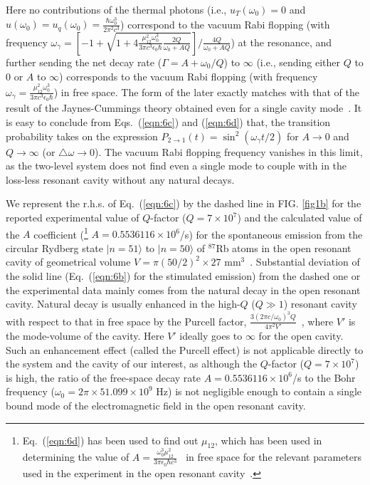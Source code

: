 \documentclass[aps,pra,twocolumn,showpacs,preprintnumbers,amsmath,amssymb,footinbib]{revtex4}
\begin{document}
Here no contributions of the thermal photons (i.e., $u_T(\omega_0)=0$ and $u(\omega_0)=u_q(\omega_0)=\frac{\hbar\omega_0^3}{2\pi^2c^3}$) correspond to the vacuum Rabi flopping (with frequency $\omega_\gamma=[-1+\sqrt{1+4\frac{\mu_{12}^2\omega_0^3}{3\pi c^3\epsilon_0\hbar}\frac{2Q}{\omega_0+AQ}}]/\frac{4Q}{\omega_0+AQ}$) at the resonance, and further sending the net decay rate ($\Gamma=A+\omega_0/Q$)  to $\infty$ (i.e., sending either $Q$ to $0$ or $A$ to $\infty$) corresponds to the vacuum Rabi flopping (with frequency $\omega_\gamma=\frac{\mu_{12}^2\omega_0^3}{3\pi c^3\epsilon_0\hbar}$) in free space. The form of the later exactly matches with that of the result of the Jaynes-Cummings theory obtained even for a single cavity mode~\cite{Jaynes}. It is easy to conclude from Eqs.~(\ref{eqn:6c}) and (\ref{eqn:6d}) that, the transition probability takes on the expression $P_{2\rightarrow1}(t)=\sin^2(\omega_\gamma t/2)$ for $A\rightarrow0$ and $Q\rightarrow\infty$ (or $\triangle\omega\rightarrow0$). The vacuum Rabi flopping frequency vanishes in this limit, as the two-level system does not find even a single mode to couple with in the loss-less resonant cavity without any {natural decays}. 

We represent the r.h.s. of Eq.~(\ref{eqn:6c}) by the dashed line in FIG. \ref{fig1b} for the reported experimental value of $Q$-factor ($Q=7\times10^7$) and the calculated value of the $A$ coefficient (\footnote{Eq.~(\ref{eqn:6d}) has been used to find out $\mu_{12}$, which has been used in determining the value of $A=\frac{\omega_0^3\mu_{12}^2}{3\pi\epsilon_0\hbar c^3}$~\cite{Weisskopf,Griffiths} in free space for the relevant parameters used in the experiment in the open resonant cavity~\cite{Brune}.} $A=0.5536116\times10^6$/s) for the spontaneous emission from the circular Rydberg state $|n=51\rangle$ to $|n=50\rangle$ of $^{87}$Rb atoms in the open resonant cavity of geometrical volume $V=\pi(50/2)^2\times27$ mm$^3$~\cite{Brune}. Substantial deviation of the solid line (Eq.~(\ref{eqn:6b}) for the stimulated emission) from the dashed one or the experimental data mainly comes from the natural decay in the open resonant cavity. Natural decay is usually enhanced in the high-$Q$ ($Q\gg1$) resonant cavity with respect to that in free space by the Purcell factor, $\frac{3(2\pi c/\omega_0)^3Q}{4\pi^2V'}$~\cite{Purcell}, where $V'$ is the mode-volume of the cavity. Here $V'$ ideally goes to $\infty$ for the open cavity. Such an enhancement effect (called the Purcell effect) is not applicable directly to the system and the cavity of our interest, as although the $Q$-factor ($Q=7\times10^7$) is high, the ratio of the free-space decay rate $A=0.5536116\times10^6$/s to the Bohr frequency ($\omega_0=2\pi\times51.099\times10^9$ Hz) is not negligible enough to contain a single bound mode of the electromagnetic field in the open resonant cavity.
	
\end{document}
